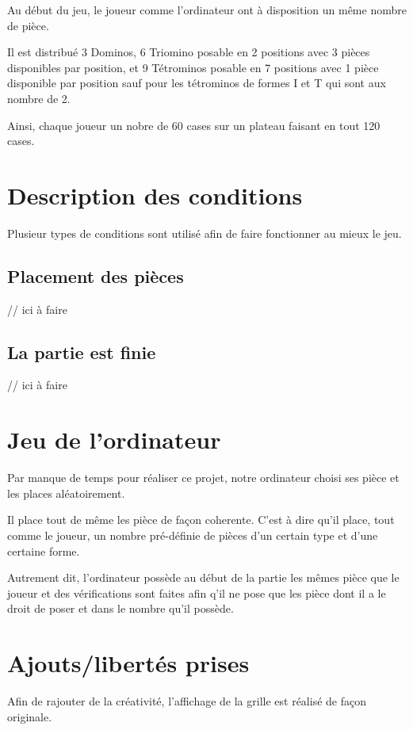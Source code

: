 \documentclass[a4paper, titlepage, french]{report}
\begin{document}
Au début du jeu, le joueur comme l'ordinateur ont à disposition un même nombre de pièce.
\bigskip

Il est distribué 3 Dominos, 6 Triomino posable en 2 positions avec 3 pièces disponibles par position, et 9 Tétrominos posable en 7 positions avec 1 pièce disponible par position sauf pour les tétrominos de formes I et T qui sont aux nombre de 2.

Ainsi, chaque joueur un nobre de 60 cases sur un plateau faisant en tout 120 cases.

\chapter{Description des conditions}

Plusieur types de conditions sont utilisé afin de faire fonctionner au mieux le jeu.

\section{Placement des pièces}

\color{red}
// ici à faire
\color{black}


\section{La partie est finie}

\color{red}
// ici à faire
\color{black}


\chapter{Jeu de l'ordinateur}

Par manque de temps pour réaliser ce projet, notre ordinateur choisi ses pièce et les places aléatoirement.
\bigskip

Il place tout de même les pièce de façon coherente. C'est à dire qu'il place, tout comme le joueur, un nombre pré-définie de pièces d'un certain type et d'une certaine forme.

Autrement dit, l'ordinateur possède au début de la partie les mêmes pièce que le joueur et des vérifications sont faites afin q'il ne pose que les pièce dont il a le droit de poser et dans le nombre qu'il possède.
\chapter{Ajouts/libertés prises}

Afin de rajouter de la créativité, l'affichage de la grille est réalisé de façon originale. 
\bigskip
\end{document}

